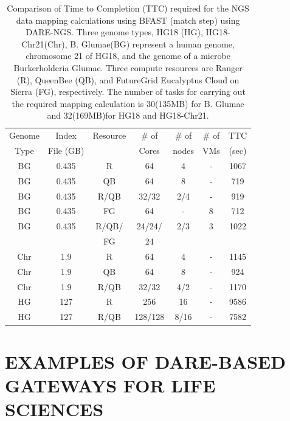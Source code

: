 \documentclass[]{svjour3}
\begin{document}
 \begin{table}
\centering
\scriptsize
 \begin{tabular}{|c|c|c|c|c|c|c|} 
 \hline 
Genome & Index         & Resource    & \# of & \# of &   \# of         &	TTC  \\
  Type               & File (GB)        & &Cores &   nodes &  VMs&  (sec)\\  
  \hline
 BG &0.435& R&	64 &4&-	&1067 \\
\hline                  
BG &0.435& QB	&	64& 8&-	&719 \\
\hline
 BG &0.435&R/QB	&	32/32 &2/4& -&919 \\
\hline
 BG &0.435& FG &	64 &-&8	&712 \\
\hline
 BG &0.435 &  R/QB/ &	24/24/& 2/3 & 3 &1022\\
 & & FG& 24 &&&\\
\hline
\hline
Chr &1.9& R	&	64& 4 &-&1145 \\
\hline
Chr &1.9& QB	&	64&8&-	&924 \\
\hline
Chr &1.9& R/QB	&	32/32& 4/2&	-&1170 \\
\hline
\hline
HG &127& R	&	256 & 16 &-	&9586\\
\hline
HG &127& R/QB	&	128/128&8/16 & -&7582 \\
\hline
\end{tabular}
\caption{
  Comparison of Time to Completion (TTC) required for the NGS data
  mapping calculations using BFAST (match step) using DARE-NGS. 
  Three genome types,
  HG18 (HG), HG18-Chr21(Chr), B. Glumae(BG) represent a human genome,
  chromosome 21 of HG18, and the genome of a microbe Burkerholderia
  Glumae. Three compute resources are Ranger (R), QueenBee (QB), and
  FutureGrid  Eucalyptus Cloud on Sierra (FG), respectively. The
  number of tasks for carrying out the required mapping calculation is
  30(135MB) for B. Glumae and 32(169MB)for HG18 and HG18-Chr21.
}

  \label{table:NGS-Distributed} 
\end{table}


\section{EXAMPLES OF DARE-BASED GATEWAYS FOR LIFE SCIENCES}
\end{document}

